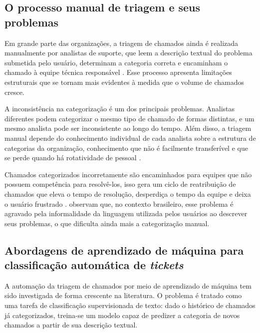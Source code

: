 \documentclass[
    12pt,                %
    openright,           %
    oneside,             %
    a4paper,             %
    english,             %
    brazil               %
]{abntex2}
\begin{document}
\subsection{O processo manual de triagem e seus problemas}
\label{subsec:helpdesk_triagem}

Em grande parte das organizações, a triagem de chamados ainda é realizada manualmente por analistas de suporte, que leem a descrição textual do problema submetida pelo usuário, determinam a categoria correta e encaminham o chamado à equipe técnica responsável \cite{zemp2021}. Esse processo apresenta limitações estruturais que se tornam mais evidentes à medida que o volume de chamados cresce.

A inconsistência na categorização é um dos principais problemas. Analistas diferentes podem categorizar o mesmo tipo de chamado de formas distintas, e um mesmo analista pode ser inconsistente ao longo do tempo. Além disso, a triagem manual depende do conhecimento individual de cada analista sobre a estrutura de categorias da organização, conhecimento que não é facilmente transferível e que se perde quando há rotatividade de pessoal \cite{wahba2023}.

Chamados categorizados incorretamente são encaminhados para equipes que não possuem competência para resolvê-los, isso gera um ciclo de reatribuição de chamados que eleva o tempo de resolução, desperdiça o tempo da equipe e deixa o usuário frustrado \cite{harun2023}.  observam que, no contexto brasileiro, esse problema é agravado pela informalidade da linguagem utilizada pelos usuários ao descrever seus problemas, o que dificulta ainda mais a categorização manual.

\subsection{Abordagens de aprendizado de máquina para classificação automática de \textit{tickets}}
\label{subsec:helpdesk_ml}

A automação da triagem de chamados por meio de aprendizado de máquina tem sido investigada de forma crescente na literatura. O problema é tratado como uma tarefa de classificação supervisionada de texto: dado o histórico de chamados já categorizados, treina-se um modelo capaz de predizer a categoria de novos chamados a partir de sua descrição textual.
\end{document}
